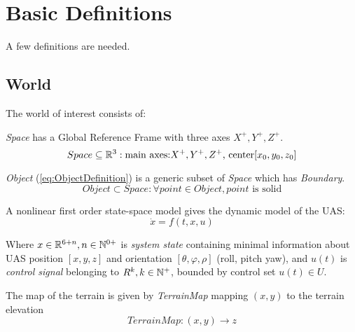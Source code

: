 \section{Basic Definitions}\label{s:basicDefinitions}
\noindent A few definitions are needed.

\subsection{World}\label{s:World} 
    \noindent The world of interest consists of:

    \emph{Space} has a Global Reference Frame with three axes $X^+,Y^+,Z^+$. 
    \begin{equation}\label{eq:SpaceDefinition}
        Space \subseteq \mathbb{R}^3:\text{main axes:} X^+,Y^+,Z^+\text{, center} [x_0,y_0,z_0] 
    \end{equation}

    \emph{Object} (\ref{eq:ObjectDefinition}) is a generic subset of \emph{Space} which has \emph{Boundary}.
    \begin{equation}\label{eq:ObjectDefinition}
        Object \subset Space: \forall point \in Object, point \text{ is solid}
    \end{equation}

    A nonlinear first order state-space model gives the dynamic model of the UAS:
    \begin{equation}\label{eq:vehicleModelAbstract}
        \dot{x} = f(t,x,u)
    \end{equation}

    \noindent Where $x\in\mathbb{R}^{6+n}, n\in\mathbb{N}^{0+}$ is \emph{system state} containing minimal information about UAS position $[x,y,z]$ and orientation $[\theta,\varphi,\rho]$ (roll, pitch yaw), and $u(t)$ is \emph{control signal} belonging to $R^k,k\in\mathbb{N}^+ $, bounded by control set $u(t)\in U$.
    
    The map of the terrain is given by \emph{TerrainMap} mapping $(x,y)$ to the terrain elevation
    \begin{equation}\label{eq:TerrainMap}
        TerrainMap: (x,y) \rightarrow z 
    \end{equation}
   
